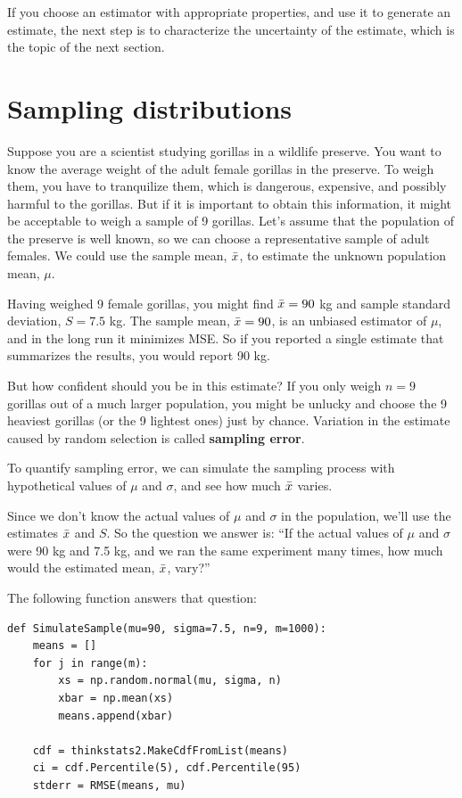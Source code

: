 \documentclass[12pt]{book}
\begin{document}
If you choose an estimator with appropriate properties, and use it to
generate an estimate, the next step is to characterize the
uncertainty of the estimate, which is the topic of the next
section.


\section{Sampling distributions}

Suppose you are a scientist studying gorillas in a wildlife
preserve.  You want to know the average weight of the adult
female gorillas in the preserve.  To weigh them, you have
to tranquilize them, which is dangerous, expensive, and possibly
harmful to the gorillas.  But if it is important to obtain this
information, it might be acceptable to weigh a sample of 9
gorillas.  Let's assume that the population of the preserve is
well known, so we can choose a representative sample of adult
females.  We could use the sample mean, $\bar{x}$, to estimate the
unknown population mean, $\mu$.

Having weighed 9 female gorillas, you might find $\bar{x}=90$ kg and
sample standard deviation, $S=7.5$ kg.  The sample mean, $\bar{x}=90$,
is an unbiased estimator of $\mu$, and in the long run it
minimizes MSE.  So if you reported a single
estimate that summarizes the results, you would report 90 kg.

But how confident should you be in this estimate?  If you only weigh
$n=9$ gorillas out of a much larger population, you might be unlucky
and choose the 9 heaviest gorillas (or the 9 lightest ones) just by
chance.  Variation in the estimate caused by random selection is
called {\bf sampling error}.

To quantify sampling error, we can simulate the
sampling process with hypothetical values of $\mu$ and $\sigma$, and
see how much $\bar{x}$ varies.

Since we don't know the actual values of 
$\mu$ and $\sigma$ in the population, we'll use the estimates
$\bar{x}$ and $S$.
So the question we answer is:
``If the actual values of $\mu$ and $\sigma$ were 90 kg and 7.5 kg,
and we ran the same experiment many times, how much would the
estimated mean, $\bar{x}$, vary?''

The following function answers that question:

\begin{verbatim}
def SimulateSample(mu=90, sigma=7.5, n=9, m=1000):
    means = []
    for j in range(m):
        xs = np.random.normal(mu, sigma, n)
        xbar = np.mean(xs)
        means.append(xbar)

    cdf = thinkstats2.MakeCdfFromList(means)
    ci = cdf.Percentile(5), cdf.Percentile(95)
    stderr = RMSE(means, mu)
\end{verbatim}
\end{document}
